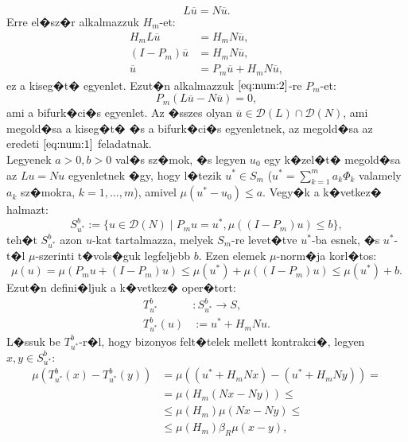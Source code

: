\begin{equation}
L\overline{u} = N\overline{u}. \label{eq:num:2}
\end{equation}
Erre el�sz�r alkalmazzuk $H_m$-et:
\begin{align}
H_m L \overline{u} &= H_m N \overline{u}, \nonumber \\
(I - P_m) \overline{u} &= H_m N \overline{u}, \nonumber \\
\overline{u} &= P_m \overline{u} + H_m N \overline{u}, \label{eq:num:3}
\end{align}
ez a kiseg�t� egyenlet. Ezut�n alkalmazzuk $\eqref{eq:num:2}$-re $P_m$-et: %
\begin{equation}
P_m(L \overline{u} - N \overline{u}) = 0, \label{eq:num:4}
\end{equation}
ami a bifurk�ci�s egyenlet. Az �sszes olyan $\overline{u} \in \mathcal{D}(L) \cap \mathcal{D}(N)$, ami megold�sa a kiseg�t� �s a bifurk�ci�s egyenletnek, az megold�sa az eredeti $\eqref{eq:num:1}$ feladatnak. \\ %
Legyenek $a > 0, b > 0$ val�s sz�mok, �s legyen $u_0$ egy k�zel�t� megold�sa az $Lu = Nu$ egyenletnek �gy, hogy l�tezik $u^* \in S_m$ ($u^* = \sum_{k=1}^m a_k \Phi_k$ valamely $a_k$ sz�mokra, $k = 1, \dots, m$), amivel $\mu(u^* - u_0) \leq a$. Vegy�k a k�vetkez� halmazt:
\begin{equation*}
S_{u^*}^b := \{ u \in \mathcal{D}(N) \; | \; P_m u = u^*, \mu((I - P_m)u) \leq b \},
\end{equation*}
teh�t $S_{u^*}^b$ azon $u$-kat tartalmazza, melyek $S_m$-re levet�tve $u^*$-ba esnek, �s $u^*$-t�l $\mu$-szerinti t�vols�guk legfeljebb $b$. Ezen elemek $\mu$-norm�ja korl�tos:
\begin{equation*}
\mu(u) = \mu(P_m u + (I - P_m) u) \leq \mu(u^*) + \mu((I - P_m)u) \leq \mu(u^*) + b.
\end{equation*}
 Ezut�n defini�ljuk a k�vetkez� oper�tort:
\begin{align*}
T_{u^*}^b &: S_{u^*}^b \rightarrow S, \\
T_{u^*}^b (u) &:= u^* + H_m N u.
\end{align*}
L�ssuk be $T_{u^*}^b$-r�l, hogy bizonyos felt�telek mellett kontrakci�, legyen $x, y \in S_{u^*}^b$:
\begin{align*}
\mu( T_{u^*}^b(x) - T_{u^*}^b(y)) &= \mu((u^* + H_m N x) - (u^* + H_m N y)) = \\
&= \mu(H_m(N x - N y)) \leq \\
&\leq \mu(H_m) \mu(N x - N y) \leq \\
&\leq \mu(H_m) \beta_R \mu(x - y),
\end{align*}
